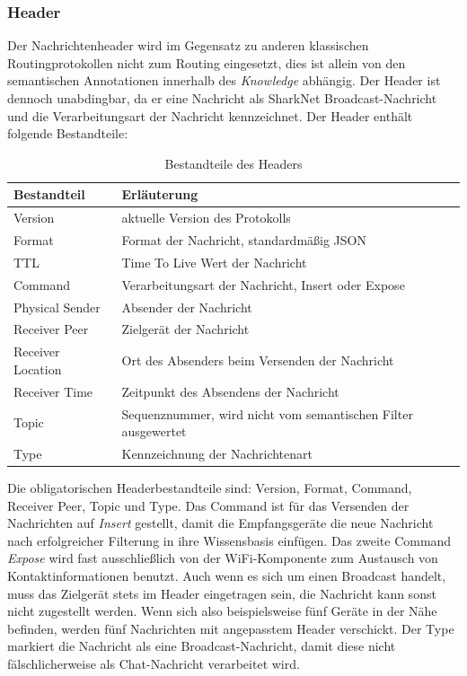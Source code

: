 \subsubsection{Header}
Der Nachrichtenheader wird im Gegensatz zu anderen klassischen Routingprotokollen nicht zum Routing eingesetzt, dies ist allein von den semantischen Annotationen innerhalb des \textit{Knowledge} abhängig. Der Header ist dennoch unabdingbar, da er eine Nachricht als SharkNet Broadcast-Nachricht und die Verarbeitungsart der Nachricht kennzeichnet. Der Header enthält folgende Bestandteile:\\
\begin{table}[H]
	\begin{center}
		\begin{tabular}{l|l} 			
			Bestandteil & Erläuterung \\
			\hline
			Version & aktuelle Version des Protokolls\\
			Format & Format der Nachricht, standardmäßig JSON\\
			TTL & Time To Live Wert der Nachricht\\
			Command & Verarbeitungsart der Nachricht, Insert oder Expose\\
			Physical Sender & Absender der Nachricht\\
			Receiver Peer & Zielgerät der Nachricht\\
			Receiver Location & Ort des Absenders beim Versenden der Nachricht\\
			Receiver Time & Zeitpunkt des Absendens der Nachricht\\
			Topic & Sequenznummer, wird nicht vom semantischen Filter ausgewertet\\
			Type & Kennzeichnung der Nachrichtenart\\							
		\end{tabular}
		\caption{Bestandteile des Headers}
		\label{tab:messageHeader}
	\end{center}
\end{table}
Die obligatorischen Headerbestandteile sind: Version, Format, Command, Receiver Peer, Topic und Type. Das Command ist für das Versenden der Nachrichten auf \textit{Insert} gestellt, damit die Empfangsgeräte die neue Nachricht nach erfolgreicher Filterung in ihre Wissensbasis einfügen. Das zweite Command \textit{Expose} wird fast ausschließlich von der WiFi-Komponente zum Austausch von Kontaktinformationen benutzt. Auch wenn es sich um einen Broadcast handelt, muss das Zielgerät stets im Header eingetragen sein, die Nachricht kann sonst nicht zugestellt werden. Wenn sich also beispielsweise fünf Geräte in der Nähe befinden, werden fünf Nachrichten mit angepasstem Header verschickt. Der Type markiert die Nachricht als eine Broadcast-Nachricht, damit diese nicht fälschlicherweise als Chat-Nachricht verarbeitet wird.\newpage
